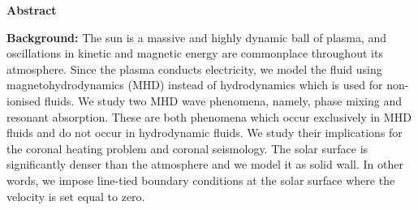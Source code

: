 \thispagestyle{plain}
\begin{center}
    
    
    
    \textbf{Abstract}
\end{center}

\begin{spacing}{1.1}

\noindent 

\textbf{Background:} 
The sun is a massive and highly dynamic ball of plasma, and oscillations in kinetic and magnetic energy are commonplace throughout its atmosphere. Since the plasma conducts electricity, we model the fluid using magnetohydrodynamics (MHD) instead of hydrodynamics which is used for non-ionised fluids. We study two MHD wave phenomena, namely, phase mixing and resonant absorption. These are both phenomena which occur exclusively in MHD fluids and do not occur in hydrodynamic fluids. We study their implications for the coronal heating problem and coronal seismology. The solar surface is significantly denser than the atmosphere and we model it as solid wall. In other words, we impose line-tied boundary conditions at the solar surface where the velocity is set equal to zero.


\end{spacing}
